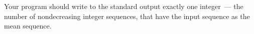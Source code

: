 Your program should write to the standard output exactly one integer~--- the number of nondecreasing integer
sequences, that have the input sequence as the mean sequence.
